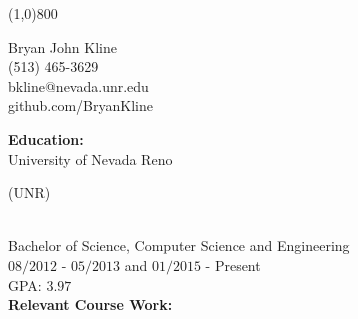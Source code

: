 \documentclass[8pt]{paper}
\begin{document}
\line(1,0){800}

\begin{flushright}
Bryan John Kline\\
(513) 465-3629\\
bkline@nevada.unr.edu\\
github.com/BryanKline\\
\end{flushright}

\begin{flushleft}
\large{\bfseries{Education:}}\\
[2mm]

University of Nevada Reno \begin{small}
(UNR)
\end{small}\\ 
Bachelor of Science, Computer Science and Engineering\\
$08/2012$ - $05/2013$ and $01/2015$ - Present\\
GPA: $3.97$\\
[2mm]

\large{\bfseries{Relevant Course Work:}}\\
[2mm]


\end{flushleft}
\end{document}
